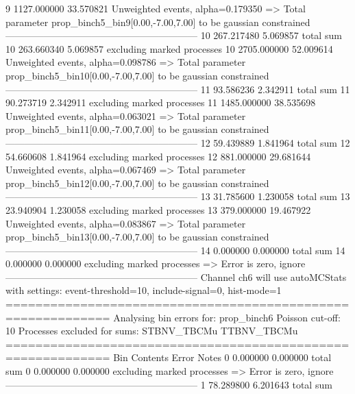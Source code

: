 9          1127.000000     33.570821       Unweighted events, alpha=0.179350
  => Total parameter prop_binch5_bin9[0.00,-7.00,7.00] to be gaussian constrained
------------------------------------------------------------
10         267.217480      5.069857        total sum                     
10         263.660340      5.069857        excluding marked processes    
10         2705.000000     52.009614       Unweighted events, alpha=0.098786
  => Total parameter prop_binch5_bin10[0.00,-7.00,7.00] to be gaussian constrained
------------------------------------------------------------
11         93.586236       2.342911        total sum                     
11         90.273719       2.342911        excluding marked processes    
11         1485.000000     38.535698       Unweighted events, alpha=0.063021
  => Total parameter prop_binch5_bin11[0.00,-7.00,7.00] to be gaussian constrained
------------------------------------------------------------
12         59.439889       1.841964        total sum                     
12         54.660608       1.841964        excluding marked processes    
12         881.000000      29.681644       Unweighted events, alpha=0.067469
  => Total parameter prop_binch5_bin12[0.00,-7.00,7.00] to be gaussian constrained
------------------------------------------------------------
13         31.785600       1.230058        total sum                     
13         23.940904       1.230058        excluding marked processes    
13         379.000000      19.467922       Unweighted events, alpha=0.083867
  => Total parameter prop_binch5_bin13[0.00,-7.00,7.00] to be gaussian constrained
------------------------------------------------------------
14         0.000000        0.000000        total sum                     
14         0.000000        0.000000        excluding marked processes    
  => Error is zero, ignore      
------------------------------------------------------------
Channel ch6 will use autoMCStats with settings: event-threshold=10, include-signal=0, hist-mode=1
============================================================
Analysing bin errors for: prop_binch6
Poisson cut-off: 10
Processes excluded for sums: STBNV_TBCMu TTBNV_TBCMu
============================================================
Bin        Contents        Error           Notes                         
0          0.000000        0.000000        total sum                     
0          0.000000        0.000000        excluding marked processes    
  => Error is zero, ignore      
------------------------------------------------------------
1          78.289800       6.201643        total sum                     
